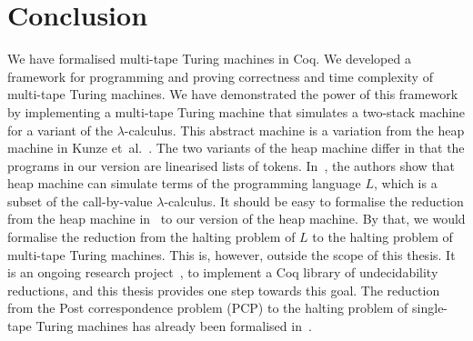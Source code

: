 \chapter{Conclusion}
\label{chap:conclusion}

We have formalised multi-tape Turing machines in Coq.  We developed a framework for programming and proving correctness and time complexity of
multi-tape Turing machines.  We have demonstrated the power of this framework by implementing a multi-tape Turing machine that simulates a two-stack
machine for a variant of the $\lambda$-calculus.  This abstract machine is a variation from the heap machine in Kunze
et~al.~\cite{KunzeEtAl:2018:Formal}.  The two variants of the heap machine differ in that the programs in our version are linearised lists of tokens.
In~\cite{KunzeEtAl:2018:Formal}, the authors show that heap machine can simulate terms of the programming language $L$, which is a subset of the
call-by-value $\lambda$-calculus.  It should be easy to formalise the reduction from the heap machine in~\cite{KunzeEtAl:2018:Formal} to our version
of the heap machine.  By that, we would formalise the reduction from the halting problem of $L$ to the halting problem of multi-tape Turing machines.
This is, however, outside the scope of this thesis.  It is an ongoing research project~\cite{ForsterLOLA}, to implement a Coq library of
undecidability reductions, and this thesis provides one step towards this goal.  The reduction from the Post correspondence problem (PCP) to the
halting problem of single-tape Turing machines has already been formalised in~\cite{PCPITP}.

